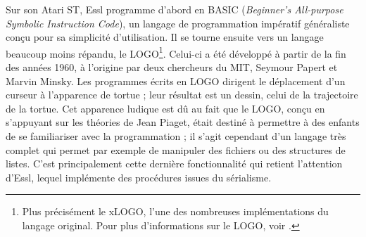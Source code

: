 \documentclass[a4paper,12pt]{article}
\begin{document}
Sur son Atari ST, Essl programme d'abord en BASIC (\emph{Beginner's All-purpose Symbolic Instruction Code}), un langage de programmation impératif généraliste conçu pour sa simplicité d'utilisation. Il se tourne ensuite vers un langage beaucoup moins répandu, le LOGO\footnote{Plus précisément le xLOGO, l'une des nombreuses implémentations du langage original. Pour plus d'informations sur le LOGO, voir \cite{harvey1985computer}.}. Celui-ci a été développé à partir de la fin des années 1960, à l'origine par deux chercheurs du MIT, Seymour Papert et Marvin Minsky. Les programmes écrits en LOGO dirigent le déplacement d'un curseur à l'apparence de tortue ; leur résultat est un dessin, celui de la trajectoire de la tortue. Cet apparence ludique est dû au fait que le LOGO, conçu en s'appuyant sur les théories de Jean Piaget, était destiné à permettre à des enfants de se familiariser avec la programmation ; il s'agit cependant d'un langage très complet qui permet par exemple de manipuler des fichiers ou des structures de listes. C'est principalement cette dernière fonctionnalité qui retient l'attention d'Essl, lequel implémente des procédures issues du sérialisme.
\end{document}
